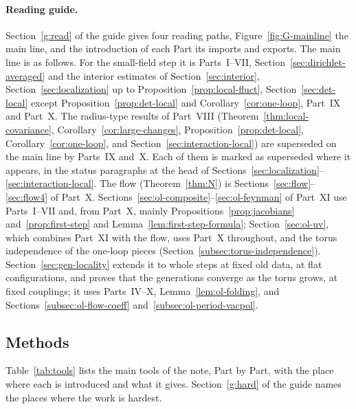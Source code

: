 \paragraph{Reading guide.} Section~\ref{g:read} of the guide gives four reading paths, Figure~\ref{fig:G-mainline} the main line, and the introduction of each Part its imports and exports. The main line is as follows. For the small-field step it is Parts~I--VII, Section~\ref{sec:dirichlet-averaged} and the interior estimates of Section~\ref{sec:interior}, Section~\ref{sec:localization} up to Proposition~\ref{prop:local-fluct}, Section~\ref{sec:det-local} except Proposition~\ref{prop:det-local} and Corollary~\ref{cor:one-loop}, Part~IX and Part~X. The radius-type results of Part~VIII (Theorem~\ref{thm:local-covariance}, Corollary~\ref{cor:large-changes}, Proposition~\ref{prop:det-local}, Corollary~\ref{cor:one-loop}, and Section~\ref{sec:interaction-local}) are superseded on the main line by Parts~IX and~X. Each of them is marked as superseded where it appears, in the status paragraphs at the head of Sections~\ref{sec:localization}--\ref{sec:interaction-local}. The flow (Theorem~\ref{thm:N}) is Sections~\ref{sec:flow}--\ref{sec:flow4} of Part~X. Sections~\ref{sec:ol-composite}--\ref{sec:ol-feynman} of Part~XI use Parts~I--VII and, from Part~X, mainly Propositions~\ref{prop:jacobians} and~\ref{prop:first-step} and Lemma~\ref{lem:first-step-formula}; Section~\ref{sec:ol-uv}, which combines Part~XI with the flow, uses Part~X throughout, and the torus independence of the one-loop pieces (Section~\ref{subsec:torus-independence}). Section~\ref{sec:gen-locality} extends it to whole steps at fixed old data, at flat configurations, and proves that the generations converge as the torus grows, at fixed couplings; it uses Parts~IV--X, Lemma~\ref{lem:ol-folding}, and Sections~\ref{subsec:ol-flow-coeff} and~\ref{subsec:ol-period-vacpol}.

\subsection{Methods}\label{ss:1.4}

Table~\ref{tab:tools} lists the main tools of the note, Part by Part, with the place where each is introduced and what it gives. Section~\ref{g:hard} of the guide names the places where the work is hardest.

